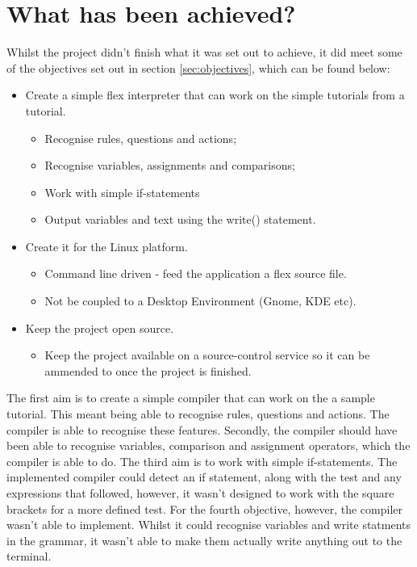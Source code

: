 \documentclass[12pt]{report}
\begin{document}
\section{What has been achieved?}\label{sec:con:achieved}
Whilst the project didn't finish what it was set out to achieve, it did meet some of the objectives set out in section \ref{sec:objectives}, which can be found below:\\
\begin{itemize}
\item Create a simple flex interpreter that can work on the simple tutorials from a tutorial.
	\begin{itemize}
	\item Recognise rules, questions and actions;
	\item Recognise variables, assignments and comparisons;
	\item Work with simple if-statements
	\item Output variables and text using the write() statement.
	\end{itemize}
\item Create it for the Linux platform.
	\begin{itemize}
	\item Command line driven - feed the application a flex source file.
	\item Not be coupled to a Desktop Environment (Gnome, KDE etc).
	\end{itemize}
\item Keep the project open source.
	\begin{itemize}
	\item Keep the project available on a source-control service so it can be ammended to once the project is finished.\\
	\end{itemize}
\end{itemize}
The first aim is to create a simple compiler that can work on the a sample tutorial.  This meant being able to recognise rules, questions and actions.  The compiler is able to recognise these features.  Secondly, the compiler should have been able to recognise variables, comparison and assignment operators, which the compiler is able to do.  The third aim is to work with simple if-statements.  The implemented compiler could detect an if statement, along with the test and any expressions that followed, however, it wasn't designed to work with the square brackets for a more defined test.  For the fourth objective, however, the compiler wasn't able to implement.  Whilst it could recognise variables and write statments in the grammar, it wasn't able to make them actually write anything out to the terminal.\\
\end{document}
